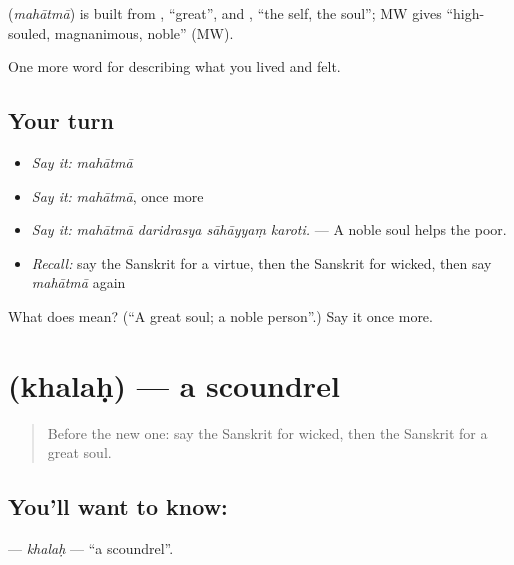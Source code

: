 \begin{cousinweb}
\textbf{} (\emph{mahātmā}) is built from \textbf{}, \textquotedblleft{}great\textquotedblright{}, and \textbf{}, \textquotedblleft{}the self, the soul\textquotedblright{}; MW gives \textquotedblleft{}high-souled, magnanimous, noble\textquotedblright{} (MW).
\end{cousinweb}

\begin{grammarlens}[title={What you've built}]
One more word for describing what you lived and felt.
\end{grammarlens}

\subsection*{Your turn}
\begin{itemize}
\raggedright
  \item \emph{Say it:} \emph{mahātmā}
  \item \emph{Say it:} \emph{mahātmā}, once more
  \item \emph{Say it:} \emph{mahātmā daridrasya sāhāyyaṃ karoti.} — A noble soul helps the poor.
  \item \emph{Recall:} say the Sanskrit for a virtue, then the Sanskrit for wicked, then say \emph{mahātmā} again
\end{itemize}

\begin{tcolorbox}[breakable,colback=teal!4,colframe=teal!35!black,title={Before you move on}]
What does  mean? (\textquotedblleft{}A great soul; a noble person\textquotedblright{}.) Say it once more.
\end{tcolorbox}
\section[\texorpdfstring{\sk{खलः} (khalaḥ)}{खलः (khalaḥ)}]{ (khalaḥ) — a scoundrel}

\label{lesson:SA-C461-khalah}



\begin{quote}
Before the new one: say the Sanskrit for wicked, then the Sanskrit for a great soul.
\end{quote}

\subsection*{You'll want to know: }
\textbf{} — \emph{khalaḥ} — \textquotedblleft{}a scoundrel\textquotedblright{}.

